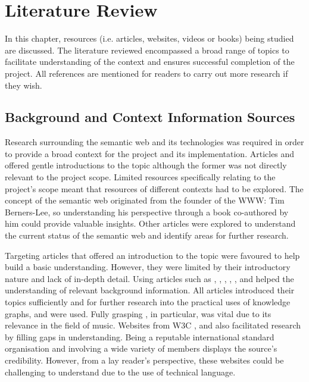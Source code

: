 \chapter{Literature Review}
In this chapter, resources (i.e. articles, websites, videos or books) being studied are discussed. The literature reviewed encompassed a broad range of topics to facilitate understanding of the context and ensures successful completion of the project. All references are mentioned for readers to carry out more research if they wish. 

\section{Background and Context Information Sources}
\hspace{0.5cm} Research surrounding the semantic web and its technologies was required in order to provide a broad context for the project and its implementation. Articles \cite{semanticweb} and \cite{berners2001semantic} offered gentle introductions to the topic although the former was not directly relevant to the project scope. Limited resources specifically relating to the project's scope meant that resources of different contexts had to be explored. The concept of the semantic web originated from the founder of the WWW: Tim Berners-Lee, so understanding his perspective through a book \cite{berners-TBLBook} co-authored by him could provide valuable insights. Other articles \cite{bizer2011linked} were explored to understand the current status of the semantic web and identify areas for further research. 

Targeting articles that offered an introduction to the topic were favoured to help build a basic understanding. However, they were limited by their introductory nature and lack of in-depth detail. Using articles such as \cite{ontology}, \cite{knowledgegraph}, \cite{sikos_2015}, \cite{gottschalk2021creation}, \cite{arasu_garcia-molina_university_2003}, \cite{studer_benjamins_fensel_1998} and \cite{rdf} helped the understanding of relevant background information. All articles introduced their topics sufficiently and for further research into the practical uses of knowledge graphs, \cite{searchengine} and \cite{oramas2016sound} were used. Fully grasping \cite{oramas2016sound}, in particular, was vital due to its relevance in the field of music. Websites from W3C \cite{TTL}, \cite{w3crdf} and \cite{w3cvocabularies} also facilitated research by filling gaps in understanding. Being a reputable international standard organisation and involving a wide variety of members displays the source's credibility. However, from a lay reader's perspective, these websites could be challenging to understand due to the use of technical language.

